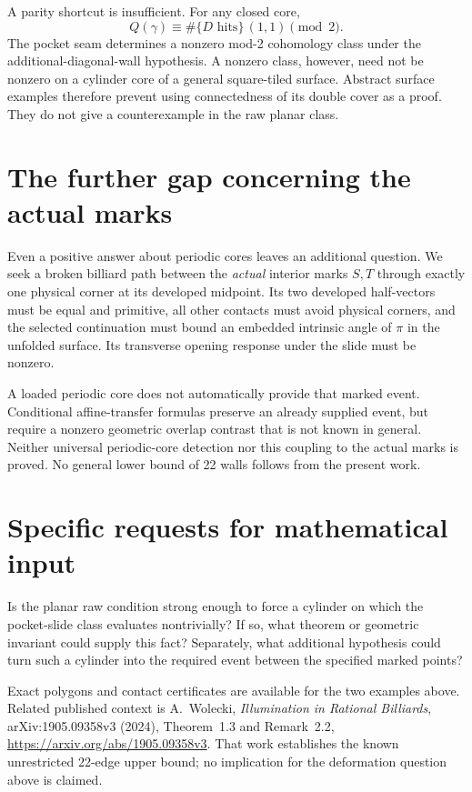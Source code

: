 \documentclass[11pt]{article}
\begin{document}
A parity shortcut is insufficient. For any closed core,
\[
 Q(\gamma)\equiv \#\{D\text{ hits}\}\,(1,1)\pmod2.
\]
The pocket seam determines a nonzero mod-2 cohomology class under the additional-diagonal-wall hypothesis. A nonzero class, however, need not be nonzero on a cylinder core of a general square-tiled surface. Abstract surface examples therefore prevent using connectedness of its double cover as a proof. They do not give a counterexample in the raw planar class.

\section*{The further gap concerning the actual marks}
Even a positive answer about periodic cores leaves an additional question. We seek a broken billiard path between the \emph{actual} interior marks $S,T$ through exactly one physical corner at its developed midpoint. Its two developed half-vectors must be equal and primitive, all other contacts must avoid physical corners, and the selected continuation must bound an embedded intrinsic angle of $\pi$ in the unfolded surface. Its transverse opening response under the slide must be nonzero.

A loaded periodic core does not automatically provide that marked event. Conditional affine-transfer formulas preserve an already supplied event, but require a nonzero geometric overlap contrast that is not known in general. Neither universal periodic-core detection nor this coupling to the actual marks is proved. No general lower bound of 22 walls follows from the present work.

\section*{Specific requests for mathematical input}
Is the planar raw condition strong enough to force a cylinder on which the pocket-slide class evaluates nontrivially? If so, what theorem or geometric invariant could supply this fact? Separately, what additional hypothesis could turn such a cylinder into the required event between the specified marked points?

\small
Exact polygons and contact certificates are available for the two examples above. Related published context is A.~Wolecki, \emph{Illumination in Rational Billiards}, arXiv:1905.09358v3 (2024), Theorem~1.3 and Remark~2.2, \url{https://arxiv.org/abs/1905.09358v3}. That work establishes the known unrestricted 22-edge upper bound; no implication for the deformation question above is claimed.
\end{document}
